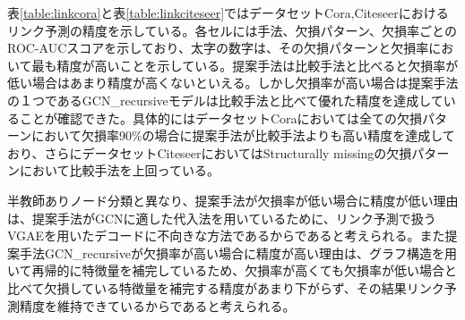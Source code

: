 表\ref{table:linkcora}と表\ref{table:linkciteseer}ではデータセットCora,Citeseerにおけるリンク予測の精度を示している。各セルには手法、欠損パターン、欠損率ごとのROC-AUCスコアを示しており、太字の数字は、その欠損パターンと欠損率において最も精度が高いことを示している。提案手法は比較手法と比べると欠損率が低い場合はあまり精度が高くないといえる。しかし欠損率が高い場合は提案手法の１つであるGCN\_recursiveモデルは比較手法と比べて優れた精度を達成していることが確認できた。具体的にはデータセットCoraにおいては全ての欠損パターンにおいて欠損率90\%の場合に提案手法が比較手法よりも高い精度を達成しており、さらにデータセットCiteseerにおいてはStructurally missingの欠損パターンにおいて比較手法を上回っている。

半教師ありノード分類と異なり、提案手法が欠損率が低い場合に精度が低い理由は、提案手法がGCNに適した代入法を用いているために、リンク予測で扱うVGAEを用いたデコードに不向きな方法であるからであると考えられる。また提案手法GCN\_recursiveが欠損率が高い場合に精度が高い理由は、グラフ構造を用いて再帰的に特徴量を補完しているため、欠損率が高くても欠損率が低い場合と比べて欠損している特徴量を補完する精度があまり下がらず、その結果リンク予測精度を維持できているからであると考えられる。

\label{sec:linkpred}

